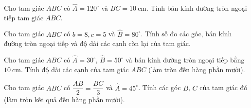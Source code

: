 \begin{bt}%
	Cho tam giác $ABC$ có $\widehat{A}= 120^\circ$ và $BC= 10 \mathrm{~cm}$. Tính bán kính đường tròn ngoại tiếp tam giác $ABC$.
\end{bt}

\begin{bt}[KNTT, Mức độ 2]%
	Cho tam giác $ABC$ có $b=8, c=5$ và $\widehat{B}=80^\circ$. Tính số đo các góc, bán kính đường tròn ngoại tiếp và độ dài các cạnh còn lại của tam giác.
\end{bt}

\begin{bt}%
	Cho tam giác $ABC$ có $\widehat{A}= 30^\circ$, $\widehat{B}=50^\circ$ và bán kính đường tròn ngoại tiếp bằng $10 \mathrm{~cm}$. Tính độ dài các cạnh của tam giác $ABC$ (làm tròn đến hàng phần mười).
\end{bt}

\begin{bt}%
	Cho tam giác $ABC$ có $\dfrac{AB}{2} = \dfrac{BC}{3}$ và $\widehat{A} = 45^\circ$. Tính các góc $B$, $C$  của tam giác đó (làm tròn kết quả đến hàng phần mười).
\end{bt}

